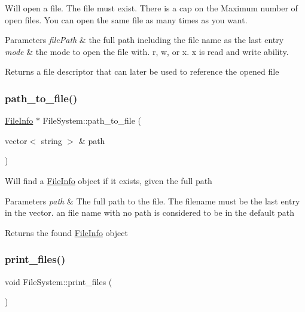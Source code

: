 Will open a file. The file must exist. There is a cap on the Maximum number of open files. You can open the same file as many times as you want. 
\begin{DoxyParams}{Parameters}
{\em file\+Path} & the full path including the file name as the last entry \\
\hline
{\em mode} & the mode to open the file with. r, w, or x. x is read and write ability. \\
\hline
\end{DoxyParams}
\begin{DoxyReturn}{Returns}
a file descriptor that can later be used to reference the opened file 
\end{DoxyReturn}
\mbox{\label{class_file_system_a6c6e95f60417b02601b72e951e7108f8}} 
\subsubsection{\texorpdfstring{path\+\_\+to\+\_\+file()}{path\_to\_file()}}
{\footnotesize\ttfamily \mbox{\hyperlink{class_file_info}{File\+Info}} $\ast$ File\+System\+::path\+\_\+to\+\_\+file (\begin{DoxyParamCaption}\item[{vector$<$ string $>$ \&}]{path }\end{DoxyParamCaption})}

Will find a \mbox{\hyperlink{class_file_info}{File\+Info}} object if it exists, given the full path 
\begin{DoxyParams}{Parameters}
{\em path} & The full path to the file. The filename must be the last entry in the vector. an file name with no path is considered to be in the default path \\
\hline
\end{DoxyParams}
\begin{DoxyReturn}{Returns}
the found \mbox{\hyperlink{class_file_info}{File\+Info}} object 
\end{DoxyReturn}
\mbox{\label{class_file_system_a8d51e4c73c71d91d94ae91355f36bdb1}} 
\subsubsection{\texorpdfstring{print\+\_\+files()}{print\_files()}}
{\footnotesize\ttfamily void File\+System\+::print\+\_\+files (\begin{DoxyParamCaption}{ }\end{DoxyParamCaption})}

